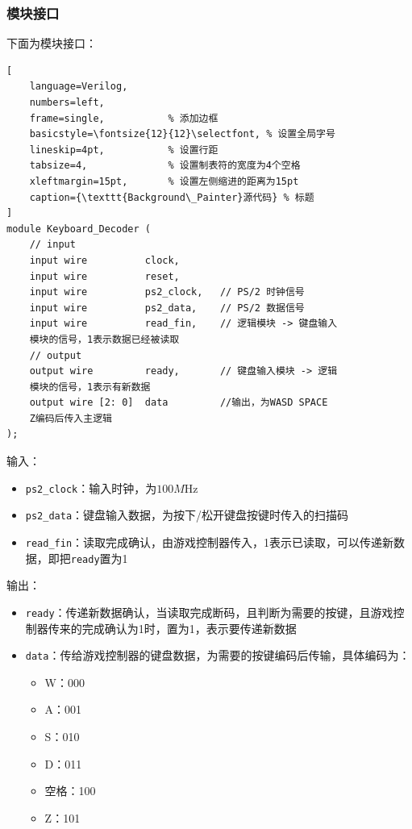 \subsubsection{模块接口} \label{subsubsection:keyboard-decoder-interface}
下面为模块接口：
\begin{lstlisting}[
    language=Verilog,
    numbers=left,
    frame=single,           % 添加边框
    basicstyle=\fontsize{12}{12}\selectfont, % 设置全局字号
    lineskip=4pt,           % 设置行距
    tabsize=4,              % 设置制表符的宽度为4个空格
    xleftmargin=15pt,       % 设置左侧缩进的距离为15pt
    caption={\texttt{Background\_Painter}源代码} % 标题
] 
module Keyboard_Decoder (
    // input
    input wire          clock,
    input wire          reset,
    input wire          ps2_clock,   // PS/2 时钟信号
    input wire          ps2_data,    // PS/2 数据信号
    input wire          read_fin,    // 逻辑模块 -> 键盘输入
    模块的信号，1表示数据已经被读取
    // output
    output wire         ready,       // 键盘输入模块 -> 逻辑    
    模块的信号，1表示有新数据
    output wire [2: 0]  data         //输出，为WASD SPACE 
    Z编码后传入主逻辑
);
\end{lstlisting}
输入：
\begin{itemize}
    \item \texttt{ps2\_clock}：输入时钟，为$100M \text{Hz}$
    \item \texttt{ps2\_data}：键盘输入数据，为按下/松开键盘按键时传入的扫描码
    \item \texttt{read\_fin}：读取完成确认，由游戏控制器传入，1表示已读取，可以传递新数据，即把\texttt{ready}置为1
\end{itemize}
输出：
\begin{itemize}
    \item \texttt{ready}：传递新数据确认，当读取完成断码，且判断为需要的按键，且游戏控制器传来的完成确认为1时，置为1，表示要传递新数据
    \item \texttt{data}：传给游戏控制器的键盘数据，为需要的按键编码后传输，具体编码为：
    \begin{itemize}
        \item W：000
        \item A：001
        \item S：010
        \item D：011
        \item 空格：100
        \item Z：101
    \end{itemize}
\end{itemize}


